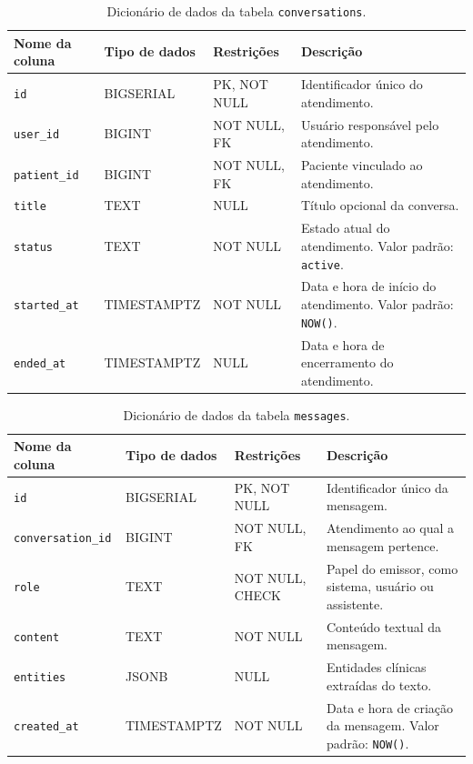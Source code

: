 \begin{apendicesenv}
\begin{table}[htb]
\centering
\small
\caption{Dicionário de dados da tabela \texttt{conversations}.}
\label{tab:dd-conversations}
\begin{tabularx}{\textwidth}{p{3.2cm}p{2.8cm}p{3.1cm}X}
\hline
Nome da coluna & Tipo de dados & Restrições & Descrição \\
\hline
\texttt{id} & BIGSERIAL & PK, NOT NULL & Identificador único do atendimento. \\
\texttt{user\_id} & BIGINT & NOT NULL, FK & Usuário responsável pelo atendimento. \\
\texttt{patient\_id} & BIGINT & NOT NULL, FK & Paciente vinculado ao atendimento. \\
\texttt{title} & TEXT & NULL & Título opcional da conversa. \\
\texttt{status} & TEXT & NOT NULL & Estado atual do atendimento. Valor padrão: \texttt{active}. \\
\texttt{started\_at} & TIMESTAMPTZ & NOT NULL & Data e hora de início do atendimento. Valor padrão: \texttt{NOW()}. \\
\texttt{ended\_at} & TIMESTAMPTZ & NULL & Data e hora de encerramento do atendimento. \\
\hline
\end{tabularx}
\end{table}

\begin{table}[htb]
\centering
\small
\caption{Dicionário de dados da tabela \texttt{messages}.}
\label{tab:dd-messages}
\begin{tabularx}{\textwidth}{p{3.2cm}p{2.8cm}p{3.1cm}X}
\hline
Nome da coluna & Tipo de dados & Restrições & Descrição \\
\hline
\texttt{id} & BIGSERIAL & PK, NOT NULL & Identificador único da mensagem. \\
\texttt{conversation\_id} & BIGINT & NOT NULL, FK & Atendimento ao qual a mensagem pertence. \\
\texttt{role} & TEXT & NOT NULL, CHECK & Papel do emissor, como sistema, usuário ou assistente. \\
\texttt{content} & TEXT & NOT NULL & Conteúdo textual da mensagem. \\
\texttt{entities} & JSONB & NULL & Entidades clínicas extraídas do texto. \\
\texttt{created\_at} & TIMESTAMPTZ & NOT NULL & Data e hora de criação da mensagem. Valor padrão: \texttt{NOW()}. \\
\hline
\end{tabularx}
\end{table}


\end{apendicesenv}
